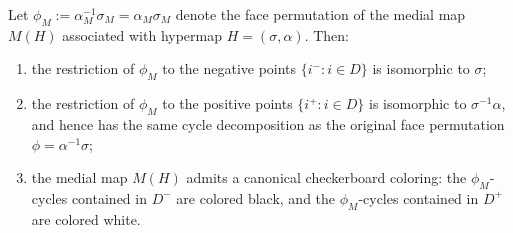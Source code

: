 \documentclass[10pt,a4paper]{amsart}
\begin{document}
\begin{lemma}\label{lem:checkerboard}
Let $\phi_M:=\alpha_M^{-1}\sigma_M=\alpha_M\sigma_M$ denote the face permutation of the medial map $M(H)$ associated with hypermap $H=(\sigma,\alpha)$. Then:
\begin{enumerate}
  \item the restriction of $\phi_M$ to the negative points $\{i^-:i\in D\}$ is isomorphic to $\sigma$;
  \item the restriction of $\phi_M$ to the positive points $\{i^+:i\in D\}$ is isomorphic to $\sigma^{-1}\alpha$, and hence has the same cycle decomposition as the original face permutation $\phi=\alpha^{-1}\sigma$;
  \item the medial map \(M(H)\) admits a canonical checkerboard coloring: the
\(\phi_M\)-cycles contained in \(D^-\) are colored black, and the
\(\phi_M\)-cycles contained in \(D^+\) are colored white. 
\end{enumerate}
\end{lemma}
\end{document}
